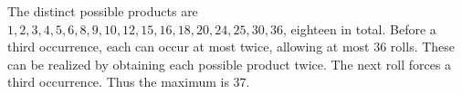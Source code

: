 The distinct possible products are $1,2,3,4,5,6,8,9,10,12,15,16,18,20,24,25,30,36$, eighteen in total. Before a third occurrence, each can occur at most twice, allowing at most $36$ rolls. These can be realized by obtaining each possible product twice. The next roll forces a third occurrence. Thus the maximum is $\boxed{37}$.
